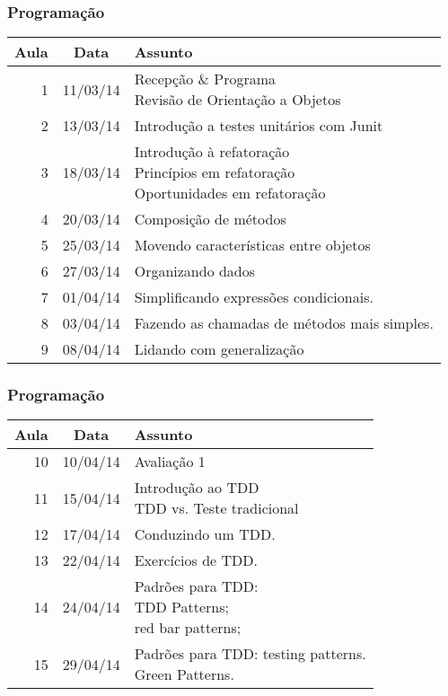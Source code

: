 \documentclass{beamer}
\begin{document}
	\begin{frame}
	\frametitle{Programação}
	
\begin{table}[htbp]
\begin{tabular}{|r|r|l|}
\hline
\multicolumn{1}{|c|}{Aula} & \multicolumn{1}{c|}{Data} & Assunto \\ \hline
1 & 11/03/14 & \shortstack[l]{Recepção \& Programa\\Revisão de Orientação a Objetos} \\ \hline
2 & 13/03/14 & Introdução a testes unitários com Junit \\ \hline
3 & 18/03/14 & \shortstack[l]{Introdução à refatoração \\Princípios em refatoração \\Oportunidades em refatoração} \\ \hline
4 & 20/03/14 & Composição de métodos \\ \hline
5 & 25/03/14 & Movendo características entre objetos \\ \hline
6 & 27/03/14 & Organizando dados \\ \hline
7 & 01/04/14 & Simplificando expressões condicionais. \\ \hline
8 & 03/04/14 & Fazendo as chamadas de métodos mais simples. \\ \hline
9 & 08/04/14 & Lidando com generalização \\ \hline


\end{tabular}
\label{}
\end{table}	
	\end{frame}
	\begin{frame}
	\frametitle{Programação}
	
\begin{table}[htbp]
\begin{tabular}{|r|r|l|}
\hline
\multicolumn{1}{|c|}{Aula} & \multicolumn{1}{c|}{Data} & Assunto \\ \hline
10 & 10/04/14 & Avaliação 1 \\ \hline
11 & 15/04/14 & \shortstack[l]{Introdução ao TDD \\TDD vs. Teste tradicional} \\ \hline
12 & 17/04/14 & Conduzindo um TDD. \\ \hline
13 & 22/04/14 & Exercícios de TDD. \\ \hline
14 & 24/04/14 &  \shortstack[l]{Padrões para TDD:\\ TDD Patterns;\\ red bar patterns;} \\ \hline
15 & 29/04/14 &  \shortstack[l]{Padrões para TDD: testing patterns.\\ Green Patterns.} \\ \hline



\end{tabular}
\label{}
\end{table}	
	\end{frame}
\end{document}
